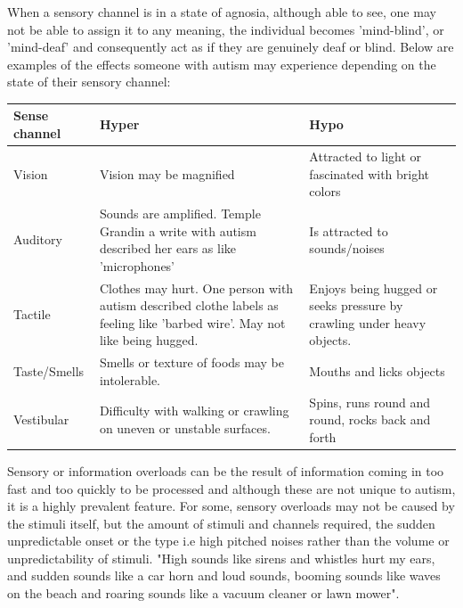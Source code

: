 When a sensory channel is in a state of agnosia, although able to see, one may not be able to assign it to any meaning, the individual becomes 'mind-blind', or 'mind-deaf' and consequently act as if they are genuinely deaf or blind. Below are examples of the effects someone with autism may experience depending on the state of their sensory channel:

\begin{table}[H]
    \begin{tabular}{| l | p{5cm} | p{5cm} |}
    \hline
    Sense channel & Hyper                                                                                                                      & Hypo                                                                   \\
    \hline
    \hline
    Vision        & Vision may be magnified                                                                                                    & Attracted to light or fascinated with bright colors                    \\
    \hline
    Auditory      & Sounds are amplified. Temple Grandin a write with autism described her ears as like 'microphones'                          & Is attracted to sounds/noises                                          \\
    \hline
    Tactile       & Clothes may hurt. One person with autism described clothe labels as feeling like 'barbed wire'. May not like being hugged. & Enjoys being hugged or seeks pressure by crawling under heavy objects. \\
    \hline
    Taste/Smells & Smells or texture of foods may be intolerable. & Mouths and licks objects \\
    \hline
    Vestibular & Difficulty with walking or crawling on uneven or unstable surfaces. & Spins, runs round and round, rocks back and forth \\
    \hline
    \end{tabular}
\end{table}

Sensory or information overloads can be the result of information coming in too fast and too quickly to be processed and although these are not unique to autism, it is a highly prevalent feature. For some, sensory overloads may not be caused by the stimuli itself, but the amount of stimuli and channels required, the sudden unpredictable onset or the type i.e high pitched noises rather than the volume or unpredictability of stimuli. "High sounds like sirens and whistles hurt my ears, and sudden sounds like a car horn and loud sounds, booming sounds like waves on the beach and roaring sounds like a vacuum cleaner or lawn mower". 

